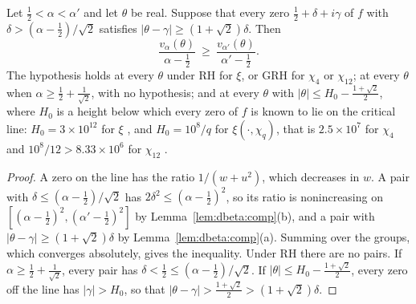 \begin{theorem}\label{thm:dbeta:comp}
Let $\frac12<\alpha<\alpha'$ and let $\theta$ be real. Suppose that every zero $\frac12+\delta+i\gamma$ of $f$ with $\delta>(\alpha-\frac12)/\sqrt2$ satisfies $|\theta-\gamma|\ge(1+\sqrt2)\delta$. Then
\[
\frac{v_\alpha(\theta)}{\alpha-\frac12}\ \ge\ \frac{v_{\alpha'}(\theta)}{\alpha'-\frac12}.
\]
The hypothesis holds at every $\theta$ under RH for $\xi$, or GRH for $\chi_4$ or $\chi_{12}$; at every $\theta$ when $\alpha\ge\frac12+\frac1{\sqrt2}$, with no hypothesis; and at every $\theta$ with $|\theta|\le H_0-\frac{1+\sqrt2}2$, where $H_0$ is a height below which every zero of $f$ is known to lie on the critical line: $H_0=3\times10^{12}$ for $\xi$ \cite{PT21}, and $H_0=10^8/q$ for $\xi(\cdot,\chi_q)$, that is $2.5\times10^7$ for $\chi_4$ and $10^8/12>8.33\times10^6$ for $\chi_{12}$ \cite{Platt16}.
\end{theorem}

\begin{proof}
A zero on the line has the ratio $1/(w+u^2)$, which decreases in $w$. A pair with $\delta\le(\alpha-\frac12)/\sqrt2$ has $2\delta^2\le(\alpha-\frac12)^2$, so its ratio is nonincreasing on $[(\alpha-\frac12)^2,(\alpha'-\frac12)^2]$ by Lemma~\ref{lem:dbeta:comp}(b), and a pair with $|\theta-\gamma|\ge(1+\sqrt2)\delta$ by Lemma~\ref{lem:dbeta:comp}(a). Summing over the groups, which converges absolutely, gives the inequality. Under RH there are no pairs. If $\alpha\ge\frac12+\frac1{\sqrt2}$, every pair has $\delta<\frac12\le(\alpha-\frac12)/\sqrt2$. If $|\theta|\le H_0-\frac{1+\sqrt2}2$, every zero off the line has $|\gamma|>H_0$, so that $|\theta-\gamma|>\frac{1+\sqrt2}2>(1+\sqrt2)\delta$.
\end{proof}

